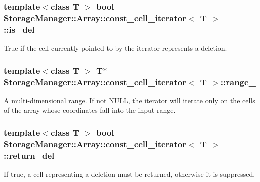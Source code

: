 \subsubsection[{is\+\_\+del\+\_\+}]{\setlength{\rightskip}{0pt plus 5cm}template$<$class T $>$ bool {\bf Storage\+Manager\+::\+Array\+::const\+\_\+cell\+\_\+iterator}$<$ T $>$\+::is\+\_\+del\+\_\+\hspace{0.3cm}{\ttfamily [private]}}\label{classStorageManager_1_1Array_1_1const__cell__iterator_aa43e8557cafb358276994ea6bbd89bd1}
True if the cell currently pointed to by the iterator represents a deletion. \hypertarget{classStorageManager_1_1Array_1_1const__cell__iterator_abe48759f70358627df97e3aaec3fe8fd}{}
\subsubsection[{range\+\_\+}]{\setlength{\rightskip}{0pt plus 5cm}template$<$class T $>$ T$\ast$ {\bf Storage\+Manager\+::\+Array\+::const\+\_\+cell\+\_\+iterator}$<$ T $>$\+::range\+\_\+\hspace{0.3cm}{\ttfamily [private]}}\label{classStorageManager_1_1Array_1_1const__cell__iterator_abe48759f70358627df97e3aaec3fe8fd}
A multi-\/dimensional range. If not N\+U\+L\+L, the iterator will iterate only on the cells of the array whose coordinates fall into the input range. \hypertarget{classStorageManager_1_1Array_1_1const__cell__iterator_a485aaee675ba572687d63dff5313c533}{}
\subsubsection[{return\+\_\+del\+\_\+}]{\setlength{\rightskip}{0pt plus 5cm}template$<$class T $>$ bool {\bf Storage\+Manager\+::\+Array\+::const\+\_\+cell\+\_\+iterator}$<$ T $>$\+::return\+\_\+del\+\_\+\hspace{0.3cm}{\ttfamily [private]}}\label{classStorageManager_1_1Array_1_1const__cell__iterator_a485aaee675ba572687d63dff5313c533}
If true, a cell representing a deletion must be returned, otherwise it is suppressed. \hypertarget{classStorageManager_1_1Array_1_1const__cell__iterator_a4c30f02f9ff4e4fdccc729df11658e42}{}

